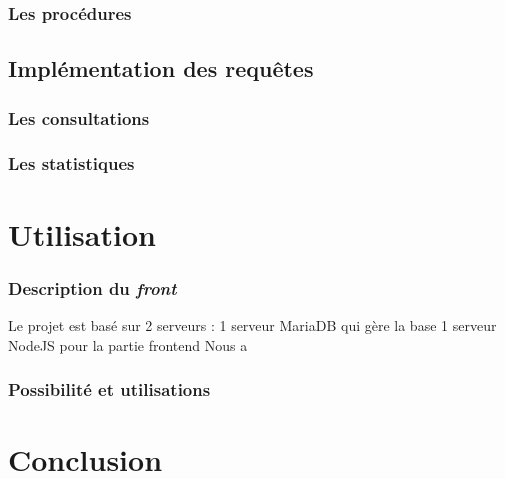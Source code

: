 \documentclass[10pt]{article}
\begin{document}
  \subsubsection{Les procédures}
  
  \subsection{Implémentation des requêtes}\label{subsec:requete}
  \subsubsection{Les consultations}
  \subsubsection{Les statistiques}
  
  \section{Utilisation}\label{sec:utili}
  \subsubsection{Description du \textit{front}}\label{subsec:desc}
  Le projet est basé sur 2 serveurs :
  1 serveur MariaDB qui gère la base
  1 serveur NodeJS pour la partie frontend
  Nous a
  \subsubsection{Possibilité et utilisations}\label{subsec:possib}

  \section{Conclusion}\label{sec:ccl}
\end{document}
